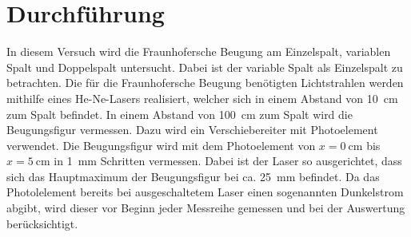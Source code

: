 
\section{Durchführung}

In diesem Versuch wird die Fraunhofersche Beugung am Einzelspalt,
variablen Spalt und Doppelspalt untersucht. Dabei ist der variable Spalt
als Einzelspalt zu betrachten.  Die für die Fraunhofersche Beugung benötigten
Lichtstrahlen werden mithilfe eines He-Ne-Lasers realisiert, welcher
sich in einem Abstand von \SI{10}{\centi\metre} zum Spalt befindet. In
einem Abstand von \SI{100}{\centi\metre} zum Spalt wird die Beugungsfigur
vermessen. Dazu wird ein Verschiebereiter mit Photoelement
verwendet. Die Beugungsfigur wird mit dem Photoelement von $x=
\SI{0}{\centi\metre}$ bis $x = \SI{5}{\centi\metre}$ in
\SI{1}{\milli\metre} Schritten vermessen. Dabei ist der Laser so
ausgerichtet, dass sich das Hauptmaximum der Beugungsfigur bei
ca. \SI{25}{\milli\metre} befindet. Da das Photolelement bereits bei
ausgeschaltetem Laser einen sogenannten Dunkelstrom abgibt, wird dieser
vor Beginn jeder Messreihe gemessen und bei der Auswertung berücksichtigt.